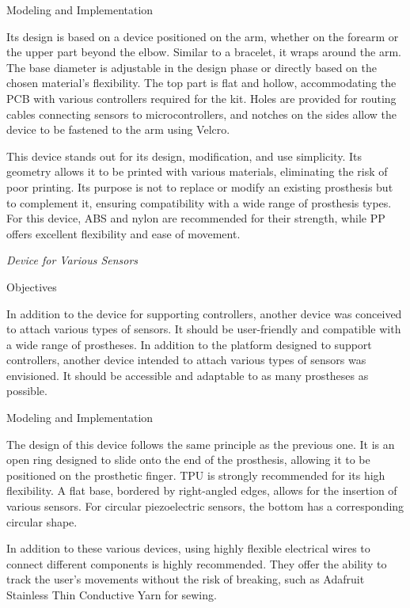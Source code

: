 \item Modeling and Implementation

Its design is based on a device positioned on the arm, whether on the forearm or the upper part beyond the elbow. Similar to a bracelet, it wraps around the arm. The base diameter is adjustable in the design phase or directly based on the chosen material's flexibility. The top part is flat and hollow, accommodating the PCB with various controllers required for the kit. Holes are provided for routing cables connecting sensors to microcontrollers, and notches on the sides allow the device to be fastened to the arm using Velcro.

This device stands out for its design, modification, and use simplicity. Its geometry allows it to be printed with various materials, eliminating the risk of poor printing. Its purpose is not to replace or modify an existing prosthesis but to complement it, ensuring compatibility with a wide range of prosthesis types. For this device, ABS and nylon are recommended for their strength, while PP offers excellent flexibility and ease of movement.

\textit{Device for Various Sensors}
\item Objectives

In addition to the device for supporting controllers, another device was conceived to attach various types of sensors. It should be user-friendly and compatible with a wide range of prostheses. In addition to the platform designed to support controllers, another device intended to attach various types of sensors was envisioned. It should be accessible and adaptable to as many prostheses as possible.

\item Modeling and Implementation

The design of this device follows the same principle as the previous one. It is an open ring designed to slide onto the end of the prosthesis, allowing it to be positioned on the prosthetic finger. TPU is strongly recommended for its high flexibility. A flat base, bordered by right-angled edges, allows for the insertion of various sensors. For circular piezoelectric sensors, the bottom has a corresponding circular shape.

In addition to these various devices, using highly flexible electrical wires to connect different components is highly recommended. They offer the ability to track the user's movements without the risk of breaking, such as Adafruit Stainless Thin Conductive Yarn for sewing.


